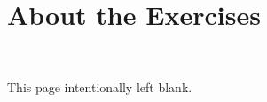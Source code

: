 \section*{About the Exercises}

\clearpage

\begin{center}

~

\vspace{3in}
This page intentionally left blank.
\end{center}